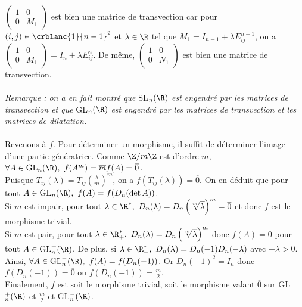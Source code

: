 \documentclass[8pt]{book}
\begin{document}
	$\left(\begin{array}{c|c}1&0\\\hline0&M_1\end{array}\right)$ est bien une matrice de transvection car pour $(i,j)\in \crblanc{1}{n-1}^2$ et $\lambda\in \R$ tel que $M_1=I_{n-1}+\lambda E^{n-1}_{ij}$, on a $\left(\begin{array}{c|c}1&0\\\hline0&M_1\end{array}\right)=I_n+\lambda E^n_{ij}$. De même, $\left(\begin{array}{c|c}1&0\\\hline0&N_1\end{array}\right)$ est bien une matrice de transvection.\\\\
	\textit{Remarque : on a en fait montré que} SL$_n(\R)$ \textit{est engendré par les matrices de transvection et que} GL$_n(\R)$ \textit{est engendré par les matrices de transvection et les matrices de dilatation.}\\\\
	Revenons à $f$. Pour déterminer un morphisme, il suffit de déterminer l'image d'une partie génératrice. Comme $\Z/m\Z$ est d'ordre $m$, $\forall A\in \text{GL}_n(\R),\ f(A^m)=\overline{m}f(A)=\overline 0$.\\
	Puisque $T_{ij}(\lambda)=\displaystyle T_{ij}\left(\frac{\lambda}{m}\right)^m$, on a $f(T_{ij}(\lambda))=\overline 0$. On en déduit que pour tout $A\in \text{GL}_n(\R),\ f(A)=f(D_n(\det A))$.\\
	Si $m$ est impair, pour tout $\lambda \in \R^*,\ D_n(\lambda)=D_n\left(\sqrt[m]\lambda\right)^m=\overline{0}$ et donc $f$ est le morphisme trivial.\\
	Si $m$ est pair, pour tout $\lambda\in \R^*_+,\ D_n(\lambda)=D_n\left(\sqrt[m]\lambda\right)^m$ donc $f(A)=\overline{0}$ pour tout $A\in \text{GL}_n^+(\R)$. De plus, si $\lambda \in \R^*_-,\ D_n(\lambda)=D_n(-1)D_n(-\lambda)$ avec $-\lambda>0$. Ainsi, $\forall A\in \text{GL}_n^-(\R),\ f(A)=f(D_n(-1))$. Or $D_n(-1)^2=I_n$ donc $f(D_n(-1))=\overline{0}$ ou $f(D_n(-1))=\overline{\displaystyle\frac{m}{2}}$.\\
	Finalement, $f$ est soit le morphisme trivial, soit le morphisme valant $\overline 0$ sur GL$_n^+(\R)$ et $\overline{\displaystyle\frac{m}{2}}$ et GL$_n^-(\R)$.
	
\end{document}
